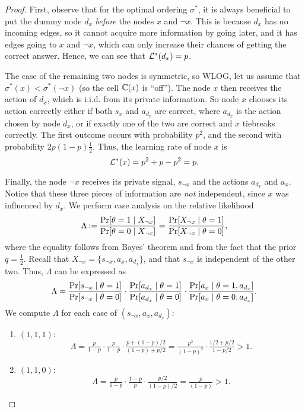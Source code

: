 \begin{proof}
    First, observe that for the optimal ordering $ \sigma^* $, it is always beneficial to put the dummy node $ d_x $ \emph{before} the nodes $ x $ and $ \lnot x $.
    This is because $ d_x $ has no incoming edges, so it cannot acquire more information by going later, and it has edges going to $ x $ and $ \lnot x $, which can only increase their chances of getting the correct answer.
    Hence, we can see that $ \mathcal{L}^*(d_x) = p $.

    The case of the remaining two nodes is symmetric, so WLOG, let us assume that $ \sigma^*(x) < \sigma^*(\lnot x) $ (so the cell $ \mathbb{C}\!\left(x\right) $ is ``off'').
    The node $ x $ then receives the action of $ d_x $, which is i.i.d. from its private information.
    So node $ x $ chooses its action correctly either if both $ s_x $ and $ a_{d_x} $ are correct, where $a_{d_x}$ is the action chosen by node $d_x$, or if exactly one of the two are correct and $ x $ tiebreaks correctly. The first outcome occurs with probability $ p^2 $, and the second with probability $ 2p (1-p) \frac 12 $.
    Thus, the learning rate of node $ x $ is \[
        \mathcal{L}^*(x) = p^2 + p - p^2 = p.
    \]

    Finally, the node $ \lnot x $ receives its private signal, $ s_{\lnot x} $ and the actions $ a_{d_x} $ and $ a_x $.
    Notice that these three pieces of information are \emph{not} independent, since $ x $ was influenced by $ d_x $.
    We perform case analysis on the relative likelihood \[
        \Lambda \mathbin{:=} \frac{\Pr\!\left[ \theta = 1 \mid X_{\lnot x} \right]}{\Pr\!\left[ \theta = 0 \mid X_{\lnot x} \right]} = \frac{\Pr\!\left[ X_{\lnot x} \mid \theta = 1 \right]}{\Pr\!\left[ X_{\lnot x} \mid \theta = 0 \right]},
    \]
    where the equality follows from Bayes' theorem and from the fact that the prior $ q = \frac 12 $.
    Recall that $ X_{\lnot x} = \{s_{\lnot x}, a_x, a_{d_x}\} $, and that $ s_{\lnot x} $ is independent of the other two.
    Thus, $ \Lambda $ can be expressed as
    \begin{align*}
        \Lambda = \frac{\Pr\!\left[ s_{\lnot x} \mid \theta = 1 \right]}{\Pr\!\left[ s_{\lnot x} \mid \theta = 0 \right]} \cdot
        \frac{\Pr\!\left[ a_{d_x} \mid \theta = 1 \right]}{\Pr\!\left[ a_{d_x} \mid \theta = 0 \right]} \cdot
        \frac{\Pr\!\left[ a_x \mid \theta = 1, a_{d_x} \right]}{\Pr\!\left[ a_x \mid \theta = 0, a_{d_x} \right]}.
    \end{align*}
    We compute $ \Lambda $ for each case of $(s_{\lnot x}, a_x, a_{d_x})$:
    \begin{enumerate}
        \item $ \left( 1,1,1 \right) $: \[
                \Lambda = \tfrac p{1-p} \cdot \tfrac p{1-p} \cdot \tfrac{p + (1-p)/2}{(1-p) + p/2} = \tfrac {p^2}{(1-p)^2} \cdot \tfrac {1/2+ p/2}{1- p/2} > 1.
        \]
        \item $ \left( 1,1,0 \right) $: \[
                \Lambda = \tfrac p{1-p} \cdot \tfrac {1-p}p \cdot \tfrac{p/2}{(1-p)/2} = \tfrac {p}{(1-p)} > 1.
        \]


\end{enumerate}
\end{proof}
